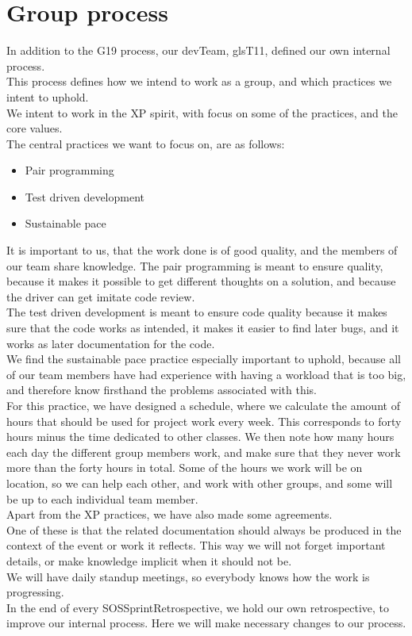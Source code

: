 \section{Group process}

In addition to the \gls{G19} process, our \gls{devTeam}, gls{T11}, defined our own internal process.\\
This process defines how we intend to work as a group, and which practices we intent to uphold. \\

We intent to work in the \gls{XP} spirit, with focus on some of the practices, and the core values.\\
The central practices we want to focus on, are as follows:
\begin{itemize}
    \item Pair programming 
    \item Test driven development
    \item Sustainable pace
\end{itemize}

It is important to us, that the work done is of good quality, and the members of our team share knowledge. The pair programming is meant to ensure quality, because it makes it possible to get different thoughts on a solution, and because the \gls{driver} can get imitate code review.\\
The test driven development is meant to ensure code quality because it makes sure that the code works as intended, it makes it easier to find later bugs, and it works as later documentation for the code.\\
We find the sustainable pace practice especially important to uphold, because all of our team members have had experience with having a workload that is too big, and therefore know firsthand the problems associated with this.\\
For this practice, we have designed a schedule, where we calculate the amount of hours that should be used for project work every week. This corresponds to forty hours minus the time dedicated to other classes. We then note how many hours each day the different group members work, and make sure that they never work more than the forty hours in total. Some of the hours we work will be on location, so we can help each other, and work with other groups, and some will be up to each individual team member.\\

Apart from the \gls{XP} practices, we have also made some agreements.\\
One of these is that the related documentation should always be produced in the context of the event or work it reflects. This way we will not forget important details, or make knowledge implicit when it should not be.\\
We will have daily standup meetings, so everybody knows how the work is progressing.\\
In the end of every \gls{SOSSprintRetrospective}, we hold our own retrospective, to improve our internal process. Here we will make necessary changes to our process.\\
